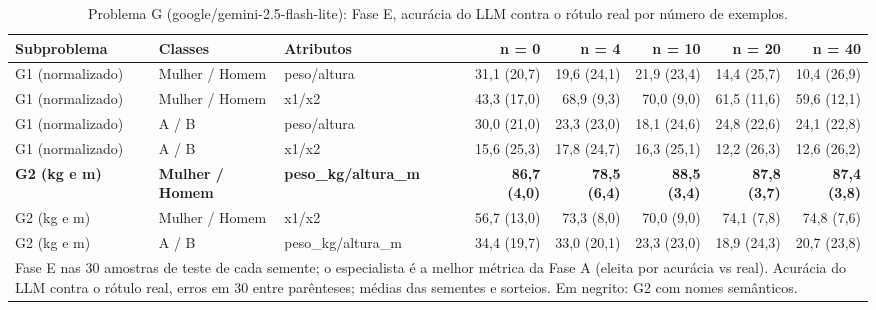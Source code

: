 \begin{table}[htbp]
\centering
\small
\caption{Problema G (google/gemini-2.5-flash-lite): Fase E, acurácia do LLM contra o rótulo real por número de exemplos.}
\label{tab:bloco3_G_faseE_nshot_flashlite}
\begin{tabular}{lllrrrrr}
\toprule
Subproblema & Classes & Atributos & n = 0 & n = 4 & n = 10 & n = 20 & n = 40 \\
\midrule
G1 (normalizado) & Mulher / Homem & peso/altura & 31,1 (20,7) & 19,6 (24,1) & 21,9 (23,4) & 14,4 (25,7) & 10,4 (26,9) \\
G1 (normalizado) & Mulher / Homem & x1/x2 & 43,3 (17,0) & 68,9 (9,3) & 70,0 (9,0) & 61,5 (11,6) & 59,6 (12,1) \\
G1 (normalizado) & A / B & peso/altura & 30,0 (21,0) & 23,3 (23,0) & 18,1 (24,6) & 24,8 (22,6) & 24,1 (22,8) \\
G1 (normalizado) & A / B & x1/x2 & 15,6 (25,3) & 17,8 (24,7) & 16,3 (25,1) & 12,2 (26,3) & 12,6 (26,2) \\
\textbf{G2 (kg e m)} & \textbf{Mulher / Homem} & \textbf{peso\_kg/altura\_m} & \textbf{86,7 (4,0)} & \textbf{78,5 (6,4)} & \textbf{88,5 (3,4)} & \textbf{87,8 (3,7)} & \textbf{87,4 (3,8)} \\
G2 (kg e m) & Mulher / Homem & x1/x2 & 56,7 (13,0) & 73,3 (8,0) & 70,0 (9,0) & 74,1 (7,8) & 74,8 (7,6) \\
G2 (kg e m) & A / B & peso\_kg/altura\_m & 34,4 (19,7) & 33,0 (20,1) & 23,3 (23,0) & 18,9 (24,3) & 20,7 (23,8) \\
\bottomrule
\multicolumn{8}{p{0.95\linewidth}}{\footnotesize Fase E nas 30 amostras de teste de cada semente; o especialista é a melhor métrica da Fase A (eleita por acurácia vs real). Acurácia do LLM contra o rótulo real, erros em 30 entre parênteses; médias das sementes e sorteios. Em negrito: G2 com nomes semânticos.} \\
\end{tabular}
\end{table}

